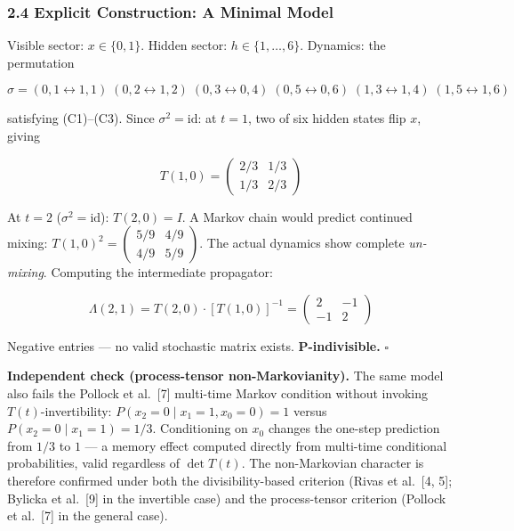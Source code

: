 \documentclass[
]{article}
\begin{document}
\hypertarget{explicit-construction-a-minimal-model}{%
\subsubsection{2.4 Explicit Construction: A Minimal
Model}\label{explicit-construction-a-minimal-model}}

Visible sector: \(x \in \{0, 1\}\). Hidden sector:
\(h \in \{1, \ldots, 6\}\). Dynamics: the permutation

\[\sigma = (0{,}1 \leftrightarrow 1{,}1)\;(0{,}2 \leftrightarrow 1{,}2)\;(0{,}3 \leftrightarrow 0{,}4)\;(0{,}5 \leftrightarrow 0{,}6)\;(1{,}3 \leftrightarrow 1{,}4)\;(1{,}5 \leftrightarrow 1{,}6)\]

satisfying (C1)--(C3). Since \(\sigma^2 = \text{id}\): at \(t = 1\), two
of six hidden states flip \(x\), giving

\[T(1,0) = \begin{pmatrix} 2/3 & 1/3 \\ 1/3 & 2/3 \end{pmatrix}\]

At \(t = 2\) (\(\sigma^2 = \text{id}\)): \(T(2,0) = I\). A Markov chain
would predict continued mixing:
\(T(1,0)^2 = \left(\begin{smallmatrix} 5/9 & 4/9 \\ 4/9 & 5/9 \end{smallmatrix}\right)\).
The actual dynamics show complete \emph{un-mixing}. Computing the
intermediate propagator:

\[\Lambda(2,1) = T(2,0) \cdot [T(1,0)]^{-1} = \begin{pmatrix} 2 & -1 \\ -1 & 2 \end{pmatrix}\]

Negative entries --- no valid stochastic matrix exists.
\textbf{P-indivisible.} \(\square\)

\textbf{Independent check (process-tensor non-Markovianity).} The same
model also fails the Pollock et al.~{[}7{]} multi-time Markov condition
without invoking \(T(t)\)-invertibility:
\(P(x_2 = 0 \mid x_1 = 1, x_0 = 0) = 1\) versus
\(P(x_2 = 0 \mid x_1 = 1) = 1/3\). Conditioning on \(x_0\) changes the
one-step prediction from \(1/3\) to \(1\) --- a memory effect computed
directly from multi-time conditional probabilities, valid regardless of
\(\det T(t)\). The non-Markovian character is therefore confirmed under
both the divisibility-based criterion (Rivas et al.~{[}4, 5{]}; Bylicka
et al.~{[}9{]} in the invertible case) and the process-tensor criterion
(Pollock et al.~{[}7{]} in the general case).
\end{document}
